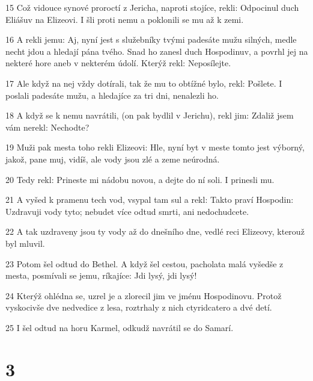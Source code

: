 \par 15 Což vidouce synové proroctí z Jericha, naproti stojíce, rekli: Odpocinul duch Eliášuv na Elizeovi. I šli proti nemu a poklonili se mu až k zemi.
\par 16 A rekli jemu: Aj, nyní jest s služebníky tvými padesáte mužu silných, medle necht jdou a hledají pána tvého. Snad ho zanesl duch Hospodinuv, a povrhl jej na nekteré hore aneb v nekterém údolí. Kterýž rekl: Neposílejte.
\par 17 Ale když na nej vždy dotírali, tak že mu to obtížné bylo, rekl: Pošlete. I poslali padesáte mužu, a hledajíce za tri dni, nenalezli ho.
\par 18 A když se k nemu navrátili, (on pak bydlil v Jerichu), rekl jim: Zdaliž jsem vám nerekl: Nechodte?
\par 19 Muži pak mesta toho rekli Elizeovi: Hle, nyní byt v meste tomto jest výborný, jakož, pane muj, vidíš, ale vody jsou zlé a zeme neúrodná.
\par 20 Tedy rekl: Prineste mi nádobu novou, a dejte do ní soli. I prinesli mu.
\par 21 A vyšed k pramenu tech vod, vsypal tam sul a rekl: Takto praví Hospodin: Uzdravuji vody tyto; nebudet více odtud smrti, ani nedochudcete.
\par 22 A tak uzdraveny jsou ty vody až do dnešního dne, vedlé reci Elizeovy, kterouž byl mluvil.
\par 23 Potom šel odtud do Bethel. A když šel cestou, pacholata malá vyšedše z mesta, posmívali se jemu, ríkajíce: Jdi lysý, jdi lysý!
\par 24 Kterýž ohlédna se, uzrel je a zlorecil jim ve jménu Hospodinovu. Protož vyskocivše dve nedvedice z lesa, roztrhaly z nich ctyridcatero a dvé detí.
\par 25 I šel odtud na horu Karmel, odkudž navrátil se do Samarí.

\chapter{3}

